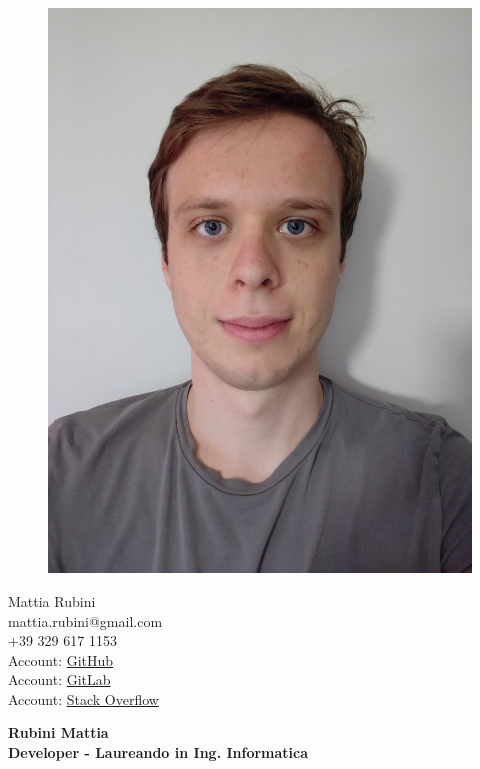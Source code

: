 \documentclass[a4paper,12pt,final]{memoir}
\begin{document}
\begin{figure}
	\hfill
	\includegraphics[width=1\columnwidth, angle=90]{photo-Mattia}
	\vspace{-7cm}
\end{figure}

\begin{flushright}\small
	Mattia Rubini \\
	mattia.rubini@gmail.com \\
	+39 329 617 1153 \\
	Account: 
	\href{https://github.com/Mot93}{GitHub}\\
	Account:
	\href{https://gitlab.com/mattia.rubini}{GitLab}\\
	Account:
	\href{https://stackoverflow.com/users/6875945/mattia-rubini}{Stack Overflow}
\end{flushright}\normalsize
\framebreak


\Huge\bfseries {\color{RoyalBlue} Rubini Mattia} \\
\Large\bfseries  Developer - Laureando in Ing. Informatica \\
\end{document}
